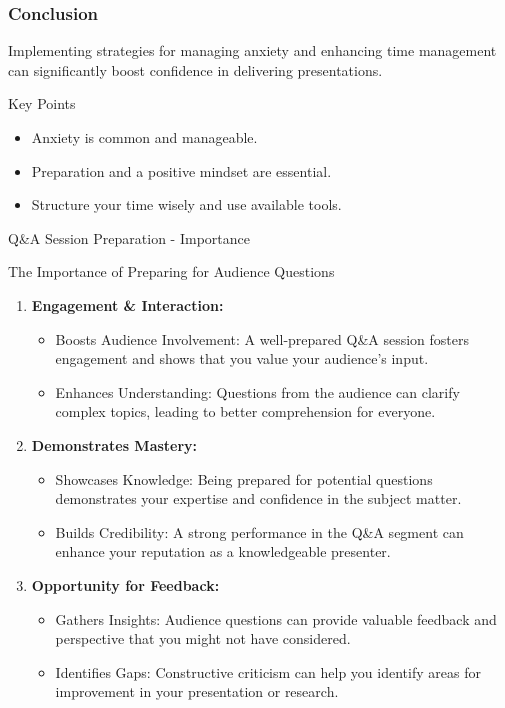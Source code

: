\documentclass[aspectratio=169]{beamer}
\begin{document}
\begin{frame}[fragile]
    \frametitle{Conclusion}
    Implementing strategies for managing anxiety and enhancing time management can significantly boost confidence in delivering presentations. 

    \begin{block}{Key Points}
        \begin{itemize}
            \item Anxiety is common and manageable.
            \item Preparation and a positive mindset are essential.
            \item Structure your time wisely and use available tools.
        \end{itemize}
    \end{block}
\end{frame}

\begin{frame}[fragile]{Q\&A Session Preparation - Importance}
    \begin{block}{The Importance of Preparing for Audience Questions}
        \begin{enumerate}
            \item \textbf{Engagement \& Interaction:}
                \begin{itemize}
                    \item Boosts Audience Involvement: A well-prepared Q\&A session fosters engagement and shows that you value your audience’s input.
                    \item Enhances Understanding: Questions from the audience can clarify complex topics, leading to better comprehension for everyone.
                \end{itemize}

            \item \textbf{Demonstrates Mastery:}
                \begin{itemize}
                    \item Showcases Knowledge: Being prepared for potential questions demonstrates your expertise and confidence in the subject matter.
                    \item Builds Credibility: A strong performance in the Q\&A segment can enhance your reputation as a knowledgeable presenter.
                \end{itemize}

            \item \textbf{Opportunity for Feedback:}
                \begin{itemize}
                    \item Gathers Insights: Audience questions can provide valuable feedback and perspective that you might not have considered.
                    \item Identifies Gaps: Constructive criticism can help you identify areas for improvement in your presentation or research.
                \end{itemize}
        \end{enumerate}
    \end{block}
\end{frame}
\end{document}
